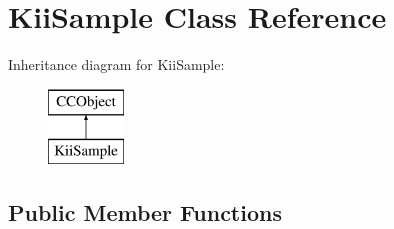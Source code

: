\hypertarget{class_kii_sample}{\section{Kii\-Sample Class Reference}
\label{class_kii_sample}
}
Inheritance diagram for Kii\-Sample\-:\begin{figure}[H]
\begin{center}
\leavevmode
\includegraphics[height=2.000000cm]{class_kii_sample}
\end{center}
\end{figure}
\subsection*{Public Member Functions}
